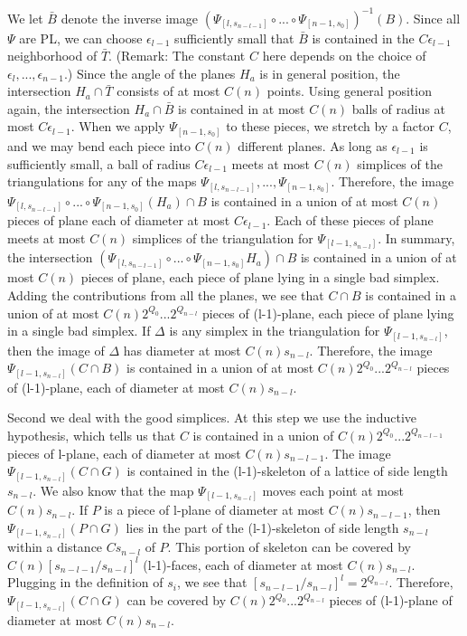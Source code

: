 \documentclass{amsart}
\newtheorem*{Theorem 1}{Theorem 1}
\newtheorem*{Theorem 2}{Theorem 2}
\newtheorem*{Theorem 1A}{Theorem 1A}
\newtheorem*{Theorem 2A}{Theorem 2A}
\newtheorem*{vanishing lemma}{Vanishing Lemma}
\numberwithin{equation}{section}
\begin{document}
We let $\bar B$ denote the inverse image $(\Psi_{[l, s_{n-l-1}]}
\circ ... \circ \Psi_{[n-1, s_0]})^{-1}(B)$. Since all $\Psi$ are
PL, we can choose $\epsilon_{l-1}$ sufficiently small that $\bar
B$ is contained in the $C \epsilon_{l-1}$ neighborhood of $\bar
T$.  (Remark: The constant $C$ here depends on the choice of
$\epsilon_l, ..., \epsilon_{n-1}$.)  Since the angle of the
planes $H_a$ is in general position, the intersection $H_a \cap
\bar T$ consists of at most $C(n)$ points.  Using general
position again, the intersection $H_a \cap \bar B$ is contained
in at most $C(n)$ balls of radius at most $C \epsilon_{l-1}$. 
When we apply $\Psi_{[n-1, s_0]}$ to these pieces, we stretch by
a factor $C$, and we may bend each piece into $C(n)$ different
planes.  As long as $\epsilon_{l-1}$ is sufficiently small, a
ball of radius $C \epsilon_{l-1}$ meets at most $C(n)$ simplices
of the triangulations for any of the maps $\Psi_{[l, s_{n-l-1}]},
...,
\Psi_{[n-1, s_0]}$.  Therefore, the image $\Psi_{[l, s_{n-l-1}]}
\circ ... \circ \Psi_{[n-1, s_0]} (H_a) \cap
B$ is contained in a union of at most $C(n)$ pieces of plane each
of diameter at most $C \epsilon_{l-1}$.  Each of these pieces of
plane meets at most $C(n)$ simplices of the triangulation for
$\Psi_{[l-1, s_{n-l}]}$.  In summary, the intersection
$(\Psi_{[l, s_{n-l-1}]} \circ ... \circ \Psi_{[n-1, s_0]} H_a)
\cap B$ is contained in a union of at most $C(n)$ pieces of
plane, each piece of plane lying in a single bad simplex.  Adding
the contributions from all the planes, we see that $C \cap B$ is
contained in a union of at most $C(n) 2^{Q_0} ... 2^{Q_{n-l}}$
pieces of (l-1)-plane, each piece of plane lying in a single bad
simplex.  If $\Delta$ is any simplex in the triangulation for
$\Psi_{[l-1, s_{n-l}]}$, then the image of $\Delta$ has diameter
at most $C(n) s_{n-l}$.  Therefore, the image $\Psi_{[l-1,
s_{n-l}]} (C \cap B)$ is contained in a union of at most $C(n)
2^{Q_0} ... 2^{Q_{n-l}}$ pieces of (l-1)-plane, each of diameter
at most $C(n) s_{n-l}$.

Second we deal with the good simplices.  At this step we use the
inductive hypothesis, which tells us that $C$ is contained in a
union of $C(n) 2^{Q_0} ... 2^{Q_{n-l-1}}$ pieces of l-plane, each
of diameter at most $C(n) s_{n-l-1}$.  The image $\Psi_{[l-1,
s_{n-l}]}(C \cap G)$ is contained in the (l-1)-skeleton of a
lattice of side length $s_{n-l}$.  We also know that the map
$\Psi_{[l-1, s_{n-l}]}$ moves each point at most $C(n) s_{n-l}$. 
If $P$ is a piece of l-plane of diameter at most $C(n)
s_{n-l-1}$, then $\Psi_{[l-1, s_{n-l}]}(P \cap G)$ lies in the
part of the (l-1)-skeleton of side length $s_{n-l}$ within a
distance $C s_{n-l}$ of $P$.  This portion of skeleton can be
covered by $C(n) [s_{n-l-1}/ s_{n-l}]^l$ (l-1)-faces, each of
diameter at most $C(n) s_{n-l}$.  Plugging in the definition of
$s_i$, we see that $[s_{n-l-1}/ s_{n-l}]^l = 2^{Q_{n-l}}$. 
Therefore, $\Psi_{[l-1, s_{n-l}]} (C \cap G)$ can be covered by
$C(n) 2^{Q_0} ... 2^{Q_{n-l}}$ pieces of (l-1)-plane of diameter
at most $C(n) s_{n-l}$. \endproof
\end{document}
